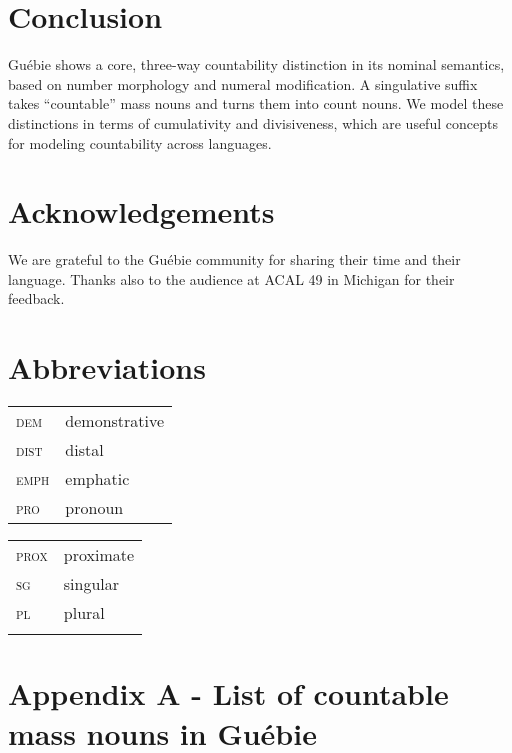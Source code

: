 \documentclass[output=paper,colorlinks,citecolor=brown]{langscibook}
\begin{document}
\section{Conclusion}\label{sec:sande:5}

Guébie shows a core, three-way countability distinction in its nominal semantics, based on number morphology and numeral modification. A singulative suffix takes ``countable'' mass nouns and turns them into count nouns. We model these distinctions in terms of cumulativity and divisiveness, which are useful concepts for modeling countability across languages.

\section*{Acknowledgements}

We are grateful to the Guébie community for sharing their time and their language. Thanks also to the audience at ACAL 49 in Michigan for their feedback.

\section*{Abbreviations}
\begin{tabularx}{.55\textwidth}{ll}
\textsc{dem} & demonstrative\\
\textsc{dist} & distal\\
\textsc{emph} & emphatic\\
\textsc{pro} & pronoun\\
\end{tabularx}
\begin{tabularx}{.45\textwidth}{ll}
\textsc{prox} & proximate\\
\textsc{sg} & singular\\
\textsc{pl} & plural\\
\\
\end{tabularx}

\section*{Appendix A - List of countable mass nouns in Guébie}
\end{document}
